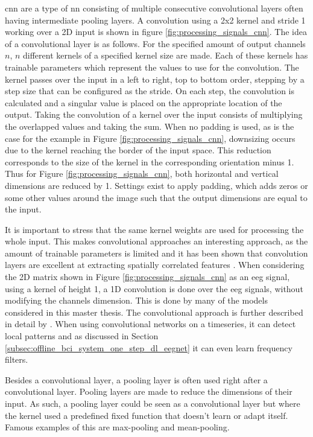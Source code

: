\Gls{cnn} are a type of \gls{nn} consisting of multiple consecutive convolutional layers often having intermediate pooling layers.
A convolution using a 2x2 kernel and stride 1 working over a 2D input is shown in figure \ref{fig:processing_signals_cnn}.
The idea of a convolutional layer is as follows.
For the specified amount of output channels $n$, $n$ different kernels of a specified kernel size are made.
Each of these kernels has trainable parameters which represent the values to use for the convolution.
The kernel passes over the input in a left to right, top to bottom order, stepping by a step size that can be configured as the stride.
On each step, the convolution is calculated and a singular value is placed on the appropriate location of the output.
Taking the convolution of a kernel over the input consists of multiplying the overlapped values and taking the sum.
When no padding is used, as is the case for the example in Figure \ref{fig:processing_signals_cnn}, downsizing occurs due to the kernel reaching the border of the input space.
This reduction corresponds to the size of the kernel in the corresponding orientation minus 1.
Thus for Figure \ref{fig:processing_signals_cnn}, both horizontal and vertical dimensions are reduced by 1.
Settings exist to apply padding, which adds zeros or some other values around the image such that the output dimensions are equal to the input.

It is important to stress that the same kernel weights are used for processing the whole input.
This makes convolutional approaches an interesting approach, as the amount of trainable parameters is limited and it has been shown that convolution layers are excellent at extracting spatially correlated features \citep{cnn_explained}.
When considering the 2D matrix shown in Figure \ref{fig:processing_signals_cnn} as an \gls{eeg} signal, using a kernel of height 1, a 1D convolution is done over the \gls{eeg} signals, without modifying the channels dimension.
This is done by many of the models considered in this master thesis.
The convolutional approach is further described in detail by \citet{cnn_explained}.
When using convolutional networks on a timeseries, it can detect local patterns and as discussed in Section \ref{subsec:offline_bci_system_one_step_dl_eegnet} it can even learn frequency filters.

Besides a convolutional layer, a pooling layer is often used right after a convolutional layer.
Pooling layers are made to reduce the dimensions of their input.
As such, a pooling layer could be seen as a convolutional layer but where the kernel used a predefined fixed function that doesn't learn or adapt itself.
Famous examples of this are max-pooling and mean-pooling.

